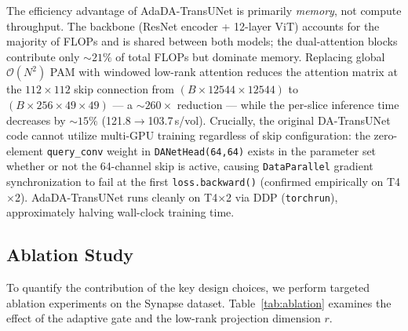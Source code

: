 \documentclass[conference]{IEEEtran}
\begin{document}
The efficiency advantage of AdaDA-TransUNet is primarily \emph{memory}, not compute throughput. The backbone (ResNet encoder + 12-layer ViT) accounts for the majority of FLOPs and is shared between both models; the dual-attention blocks contribute only ${\sim}21\%$ of total FLOPs but dominate memory. Replacing global $\mathcal{O}(N^2)$ PAM with windowed low-rank attention reduces the attention matrix at the $112\!\times\!112$ skip connection from $(B\!\times\!12544\!\times\!12544)$ to $(B\!\times\!256\!\times\!49\!\times\!49)$ — a ${\sim}260\times$ reduction — while the per-slice inference time decreases by ${\sim}15\%$ (121.8$\to$103.7\,s/vol). Crucially, the original DA-TransUNet code cannot utilize multi-GPU training regardless of skip configuration: the zero-element \texttt{query\_conv} weight in \texttt{DANetHead(64,64)} exists in the parameter set whether or not the 64-channel skip is active, causing \texttt{DataParallel} gradient synchronization to fail at the first \texttt{loss.backward()} (confirmed empirically on T4$\times$2). AdaDA-TransUNet runs cleanly on T4$\times$2 via DDP (\texttt{torchrun}), approximately halving wall-clock training time.

\subsection{Ablation Study}

To quantify the contribution of the key design choices, we perform targeted ablation experiments on the Synapse dataset. Table~\ref{tab:ablation} examines the effect of the adaptive gate and the low-rank projection dimension $r$.
\end{document}
